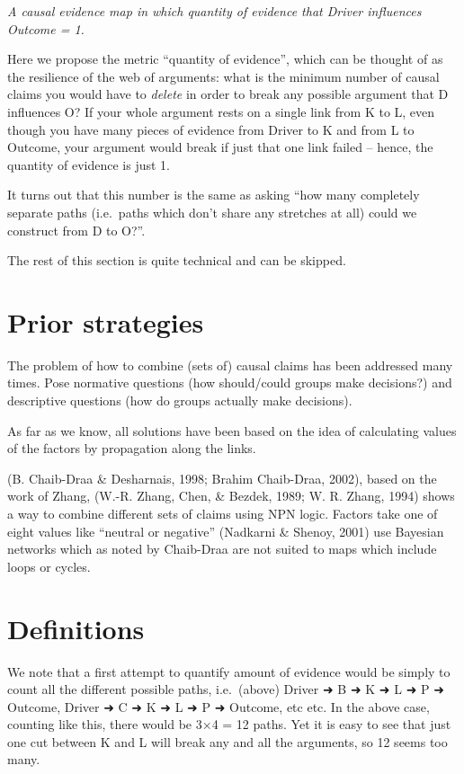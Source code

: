 \documentclass[
]{book}
\begin{document}
\emph{A causal evidence map in which quantity of evidence that Driver influences Outcome = 1.}

Here we propose the metric ``quantity of evidence'', which can be thought of as the resilience of the web of arguments: what is the minimum number of causal claims you would have to \emph{delete} in order to break any possible argument that D influences O? If your whole argument rests on a single link from K to L, even though you have many pieces of evidence from Driver to K and from L to Outcome, your argument would break if just that one link failed -- hence, the quantity of evidence is just 1.

It turns out that this number is the same as asking ``how many completely separate paths (i.e.~paths which don't share any stretches at all) could we construct from D to O?''.

The rest of this section is quite technical and can be skipped.

\hypertarget{prior-strategies}{%
\section{Prior strategies}\label{prior-strategies}}

The problem of how to combine (sets of) causal claims has been addressed many times. Pose normative questions (how should/could groups make decisions?) and descriptive questions (how do groups actually make decisions).

As far as we know, all solutions have been based on the idea of calculating values of the factors by propagation along the links.

(B. Chaib-Draa \& Desharnais, 1998; Brahim Chaib-Draa, 2002), based on the work of Zhang, (W.-R. Zhang, Chen, \& Bezdek, 1989; W. R. Zhang, 1994) shows a way to combine different sets of claims using NPN logic. Factors take one of eight values like ``neutral or negative'' (Nadkarni \& Shenoy, 2001) use Bayesian networks which as noted by Chaib-Draa are not suited to maps which include loops or cycles.

\hypertarget{definitions}{%
\section{Definitions}\label{definitions}}

We note that a first attempt to quantify amount of evidence would be simply to count all the different possible paths, i.e.~(above) Driver ➜ B ➜ K ➜ L ➜ P ➜ Outcome, Driver ➜ C ➜ K ➜ L ➜ P ➜ Outcome, etc etc. In the above case, counting like this, there would be 3×4 = 12 paths. Yet it is easy to see that just one cut between K and L will break any and all the arguments, so 12 seems too many.
\end{document}
